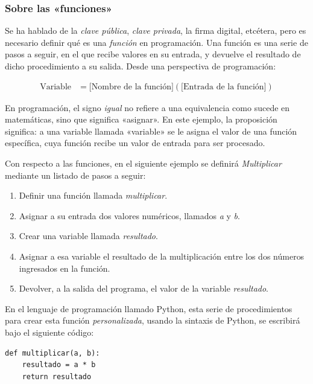 \documentclass[12pt,a4paper,twoside]{book}
\begin{document}
\subsubsection{Sobre las «funciones»}
Se ha hablado de la \textit{clave pública}, \textit{clave privada}, la firma digital, etcétera, pero es necesario definir qué es una \textit{función} en programación. Una función es una serie de pasos a seguir, en el que recibe valores en su entrada, y devuelve el resultado de dicho procedimiento a su salida. Desde una perspectiva de programación:

\begin{align*}
\text{Variable} &= \text{[Nombre de la función]} \left ( \text{[Entrada de la función]} \right )
\end{align*}

En programación, el signo \textit{igual} no refiere a una equivalencia como sucede en matemáticas, sino que significa «asignar». En este ejemplo, la proposición significa: a una variable llamada «variable» se le asigna el valor de una función específica, cuya función recibe un valor de entrada para ser procesado.

Con respecto a las funciones, en el siguiente ejemplo se definirá \textit{Multiplicar} mediante un listado de pasos a seguir:

\begin{enumerate}
\item Definir una función llamada \textit{multiplicar}.
\item Asignar a su entrada dos valores numéricos, llamados \textit{a} y \textit{b}.
\item Crear una variable llamada \textit{resultado}.
\item Asignar a esa variable el resultado de la multiplicación entre los dos números ingresados en la función.
\item Devolver, a la salida del programa, el valor de la variable \textit{resultado}.
\end{enumerate}

En el lenguaje de programación llamado Python, esta serie de procedimientos para crear esta función \textit{personalizada}, usando la sintaxis de Python, se escribirá bajo el siguiente código:

\lstset{language=Python, firstnumber=auto, showstringspaces=false, numbers=left}
\begin{lstlisting}
def multiplicar(a, b):
    resultado = a * b
    return resultado
\end{lstlisting}
\end{document}
